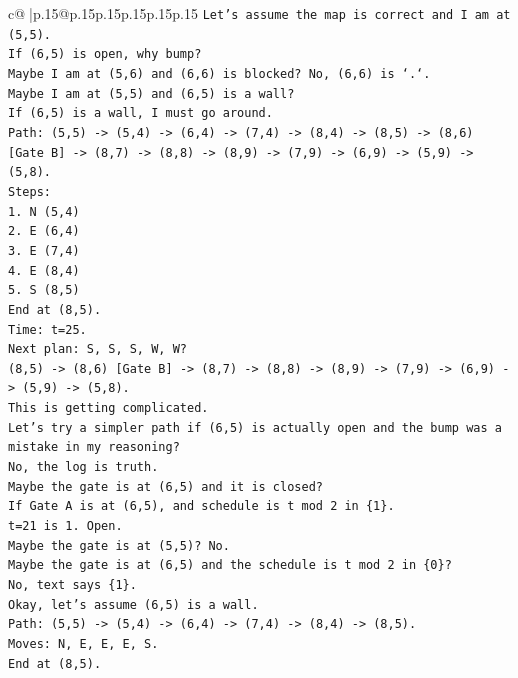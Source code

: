 \documentclass{article}
\begin{document}
{\begin{supertabular}{c@{$\;$}|p{.15\linewidth}@{}p{.15\linewidth}p{.15\linewidth}p{.15\linewidth}p{.15\linewidth}p{.15\linewidth}}
{{{\texttt{Let's assume the map is correct and I am at (5,5).} \\
\texttt{If (6,5) is open, why bump?} \\
\texttt{Maybe I am at (5,6) and (6,6) is blocked? No, (6,6) is `.`.} \\
\texttt{Maybe I am at (5,5) and (6,5) is a wall?} \\
\texttt{If (6,5) is a wall, I must go around.} \\
\texttt{Path: (5,5) {-}> (5,4) {-}> (6,4) {-}> (7,4) {-}> (8,4) {-}> (8,5) {-}> (8,6) {[}Gate B{]} {-}> (8,7) {-}> (8,8) {-}> (8,9) {-}> (7,9) {-}> (6,9) {-}> (5,9) {-}> (5,8).} \\
\texttt{Steps:} \\
\texttt{1. N (5,4)} \\
\texttt{2. E (6,4)} \\
\texttt{3. E (7,4)} \\
\texttt{4. E (8,4)} \\
\texttt{5. S (8,5)} \\
\texttt{End at (8,5).} \\
\texttt{Time: t=25.} \\
\texttt{Next plan: S, S, S, W, W?} \\
\texttt{(8,5) {-}> (8,6) {[}Gate B{]} {-}> (8,7) {-}> (8,8) {-}> (8,9) {-}> (7,9) {-}> (6,9) {-}> (5,9) {-}> (5,8).} \\
\texttt{This is getting complicated.} \\
\texttt{Let's try a simpler path if (6,5) is actually open and the bump was a mistake in my reasoning?} \\
\texttt{No, the log is truth.} \\
\texttt{Maybe the gate is at (6,5) and it is closed?} \\
\texttt{If Gate A is at (6,5), and schedule is t mod 2 in \{1\}.} \\
\texttt{t=21 is 1. Open.} \\
\texttt{Maybe the gate is at (5,5)? No.} \\
\texttt{Maybe the gate is at (6,5) and the schedule is t mod 2 in \{0\}?} \\
\texttt{No, text says \{1\}.} \\
\texttt{Okay, let's assume (6,5) is a wall.} \\
\texttt{Path: (5,5) {-}> (5,4) {-}> (6,4) {-}> (7,4) {-}> (8,4) {-}> (8,5).} \\
\texttt{Moves: N, E, E, E, S.} \\
\texttt{End at (8,5).} \\
}}}
\end{supertabular}}
\end{document}
